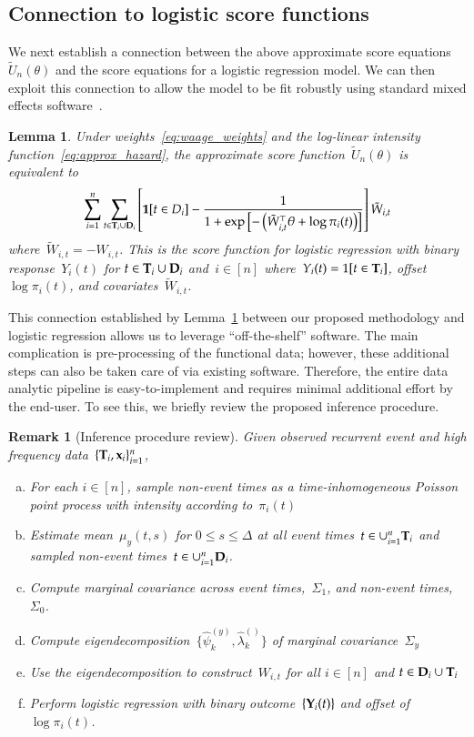 \documentclass[12pt]{amsart}
\newtheorem{lemma}[thm]{Lemma}
\newtheorem{rmk}[thm]{Remark}%
\def\Y{{\bf Y}}
\def\bfx{{\bf x}}
\def\bfT{{\bf T}}
\def\bfD{{\bf D}}
\begin{document}
\subsection{Connection to logistic score functions}
\label{eq:logistication}

We next establish a connection between the above approximate score equations~$\tilde U_n (\theta)$ and the score equations for a logistic regression model. We can then exploit this connection to allow the model to be fit robustly using standard mixed effects software~\citep{Ruppert2002, McCulloch2001}.

\begin{lemma} \normalfont
\label{lemma:logistic}
Under weights~\eqref{eq:waage_weights} and the log-linear intensity function~\eqref{eq:approx_hazard}, the approximate score function~$\tilde U_n (\theta)$ is equivalent to
\[
\sum_{i=1}^n \sum_{t \in \bfT_i \cup \bfD_i } \left[ {\bf 1}[t \in D_i]
  - \frac{1}{1 + \exp \left[- \left( \tilde{W}_{i,t}^\top \theta +
        \log \pi_i (t) \right) \right]} \right] \tilde{W}_{i,t}
\]
where~$\tilde W_{i,t} = -W_{i,t}$. This is the score function for logistic regression with binary response~$Y_i(t)$ for $t \in \bfT_i \cup \bfD_i$ and~$i \in [n]$ where~$Y_i(t) = 1[t \in \bfT_i]$, offset~$\log \pi_i (t)$, and covariates~$\tilde W_{i,t}$.
\end{lemma}

This connection established by Lemma~\ref{lemma:logistic} between our proposed methodology and logistic regression allows us to leverage ``off-the-shelf'' software.  The main complication is pre-processing of the functional data; however, these additional steps can also be taken care of via existing software.  Therefore, the entire data analytic pipeline is easy-to-implement and requires minimal additional effort by the end-user. To see this, we briefly review the proposed inference procedure.

\begin{rmk}[Inference procedure review] \normalfont
Given observed recurrent event and high frequency data~$\{ \bfT_i, \bfx_i \}_{i=1}^n$,
\begin{enumerate}[(a)]
\item For each $i \in [n]$, sample non-event times as a time-inhomogeneous Poisson point process with intensity according to~$\pi_i (t)$
\item \label{p2} Estimate mean~$\mu_y (t,s)$ for $0 \leq s \leq \Delta$ at all event times~$t \in \cup_{i=1}^n \bfT_i$ and sampled non-event times~$t \in \cup_{i=1}^n \bfD_i$.
\item \label{p3} Compute marginal covariance across event times,~$\Sigma_1$, and non-event times,~$\Sigma_0$.
\item \label{p4} Compute eigendecomposition~$\{ \hat \psi_k^{(y)}, \hat \lambda_k^{()} \}$ of marginal covariance~$\Sigma_y$
\item Use the eigendecomposition to construct~$W_{i,t}$ for all $i \in [n]$ and $t \in \bfD_i \cup \bfT_i$
\item \label{point:log} Perform logistic regression with binary outcome~$\{ \Y_i (t) \}$  and offset of~$\log \pi_i (t)$.
\end{enumerate}
\end{rmk}
\end{document}
